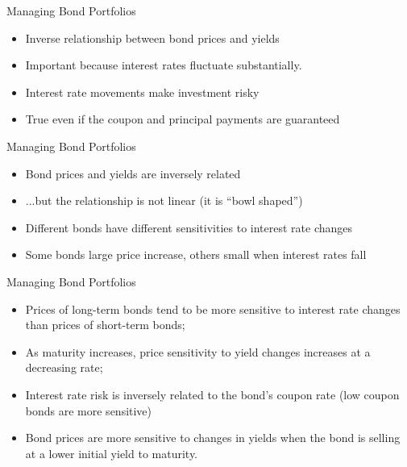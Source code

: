 \documentclass{beamer}
\begin{document}
\begin{frame}{Managing Bond Portfolios}
    \begin{itemize}
        \item Inverse relationship between bond prices and yields
        \item Important because interest rates fluctuate substantially. 
        \item Interest rate movements make investment risky 
        \item True even if the coupon and principal payments are guaranteed
    \end{itemize}
\end{frame}

\begin{frame}{Managing Bond Portfolios}
    \begin{itemize}
        \item Bond prices and yields are inversely related
        \item ...but the relationship is not linear (it is ``bowl shaped'')
        \item Different bonds have different sensitivities to interest rate changes
        \item Some bonds large price increase, others small when interest rates fall
    \end{itemize}
\end{frame}

\begin{frame}{Managing Bond Portfolios}
    \begin{itemize}
        \item Prices of long-term bonds tend to be more sensitive to interest rate changes than prices of short-term bonds; 
        \item As maturity increases, price sensitivity to yield changes increases at a decreasing rate;
        \item  Interest rate risk is inversely related to the bond’s coupon rate (low coupon bonds are more sensitive)
    \item  Bond prices are more sensitive to changes in yields when the bond is selling at a lower initial yield to maturity.
    \end{itemize}
\end{frame}
\end{document}
